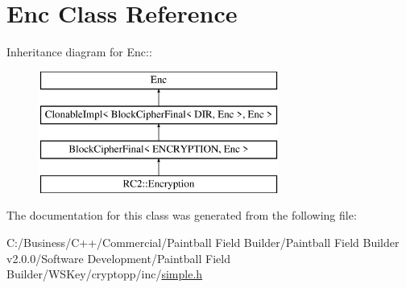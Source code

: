 \hypertarget{class_enc}{
\section{Enc Class Reference}
\label{class_enc}
}
Inheritance diagram for Enc::\begin{figure}[H]
\begin{center}
\leavevmode
\includegraphics[height=4cm]{class_enc}
\end{center}
\end{figure}


The documentation for this class was generated from the following file:\begin{DoxyCompactItemize}
\item 
C:/Business/C++/Commercial/Paintball Field Builder/Paintball Field Builder v2.0.0/Software Development/Paintball Field Builder/WSKey/cryptopp/inc/\hyperlink{simple_8h}{simple.h}\end{DoxyCompactItemize}
